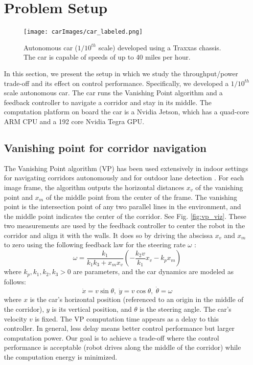 \section{Problem Setup}
\label{sec:problemSetup}
\begin{figure}[t]
	\centering
	\texttt{[image: carImages/car\_labeled.png]}
	\caption{Autonomous car ($1/10^{th}$ scale) developed using a Traxxas chassis. The car is capable of speeds of up to 40 miles per hour.}
	\label{fig:traxxas}
\end{figure} 
In this section, we present the setup in which we study the throughput/power trade-off and its effect on control performance. 
Specifically, we developed a $1/10^{th}$ scale autonomous car.
The car runs the Vanishing Point algorithm \cite{VP1,VP2} and a feedback controller to navigate a corridor and stay in its middle.
The computation platform on board the car is a Nvidia Jetson, which has a quad-core ARM CPU and a 192 core Nvidia Tegra GPU.


\subsection{Vanishing point for corridor navigation}
\label{sec:vp}
The Vanishing Point algorithm (VP) \cite{VP1} has been used extensively in indoor settings for navigating corridors autonomously \cite{VP2, VP3} and for outdoor lane detection \cite{gallagher2002ground}.
For each image frame, the algorithm outputs the horizontal distances $x_v$ of the vanishing point and $x_m$ of the middle point from the center of the frame. 
The vanishing point is the intersection point of any two parallel lines in the environment, and the middle point indicates the center of the corridor. 
See Fig. \ref{fig:vp_viz}.
These two measurements are used by the feedback controller to center the robot in the corridor and align it with the walls. 
It does so by driving the abscissa $x_v$ and $x_m$ to zero using the following feedback law for the steering rate $\omega$ \cite{VP2}:
\begin{equation}
\omega = \frac{k_1}{k_1k_3+x_mx_v}(-\frac{k_2v}{k_1}x_v -k_px_m)
\label{eq:controller}
\end{equation}
where $k_p,k_1,k_2,k_3 > 0$ are parameters, and the car dynamics are modeled as follows:
\begin{equation}
\label{eq:cardynamics}
\dot{x} = v\sin\theta,\; \dot{y} = v\cos\theta, \;\dot{\theta} = \omega 
\end{equation}
where $x$ is the car's horizontal position (referenced to an origin in the middle of the corridor), $y$ is its vertical position, and $\theta$ is the steering angle.
The car's velocity $v$ is fixed.
The VP computation time appears as a delay to this controller. 
In general, less delay means better control performance but larger computation power. 
Our goal is to achieve a trade-off where the control performance is acceptable (robot drives along the middle of the corridor) while the computation energy is minimized. 

